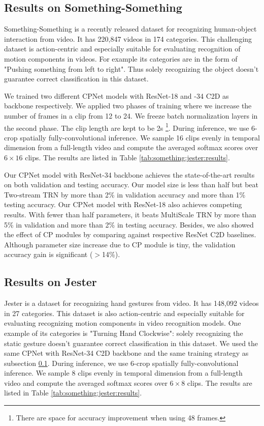 \documentclass[10pt,twocolumn,letterpaper]{article}
\begin{document}
\subsection{Results on Something-Something}
\label{sec:something:something}

Something-Something \cite{Something:Something} is a recently released dataset for recognizing human-object interaction from video. It has 220,847 videos in 174 categories. This challenging dataset is action-centric and especially suitable for evaluating recognition of motion components in videos. For example its categories are in the form of "Pushing something from left to right". Thus solely recognizing the object doesn't guarantee correct classification in this dataset. 

We trained two different CPNet models with ResNet-18 and -34 C2D as backbone respectively. We applied two phases of training where we increase the number of frames in a clip from 12 to 24. We freeze batch normalization layers in the second phase. The clip length are kept to be 2s \footnote{There are space for accuracy improvement when using 48 frames.}. During inference, we use 6-crop spatially fully-convolutional inference. We sample 16 clips evenly in temporal dimension from a full-length video and compute the averaged softmax scores over $6\times16$ clips. The results are listed in Table \ref{tab:something:jester:results}.

Our CPNet model with ResNet-34 backbone achieves the state-of-the-art results on both validation and testing accuracy. Our model size is less than half but beat Two-stream TRN \cite{TRN} by more than 2\% in  validation accuracy and more than 1\% testing accuracy. Our CPNet model with ResNet-18 also achieves competing results. With fewer than half parameters, it beats MultiScale TRN \cite{TRN} by more than 5\% in validation and more than 2\% in testing accuracy.
Besides, we also showed the effect of CP modules by comparing against respective ResNet C2D baselines. Although parameter size increase due to CP module is tiny, the validation accuracy gain is significant ($>$14\%).


\subsection{Results on Jester}

Jester \cite{Jester} is a dataset for recognizing hand gestures from video. It has 148,092 videos in 27 categories. This dataset is also action-centric and especially suitable for evaluating recognizing motion components in video recognition models. One example of its categories is "Turning Hand Clockwise": solely recognizing the static gesture doesn't guarantee correct classification in this dataset. 
We used the same CPNet with ResNet-34 C2D backbone and the same training strategy as subsection \ref{sec:something:something}. During inference, we use 6-crop spatially fully-convolutional inference. We sample 8 clips evenly in temporal dimension from a full-length video and compute the averaged softmax scores over $6\times8$ clips. The results are listed in Table \ref{tab:something:jester:results}.
\end{document}
